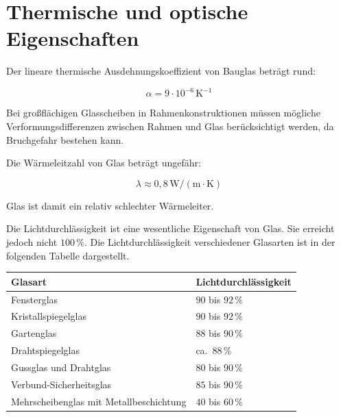 \documentclass[
  12pt,
  a4paper,
  oneside
]{scrreprt}
\begin{document}
\section{Thermische und optische Eigenschaften}

Der lineare thermische Ausdehnungskoeffizient von Bauglas beträgt rund:

\begin{equation}
  \alpha =
  9 \cdot 10^{-6}\,\mathrm{K^{-1}}
\end{equation}

Bei großflächigen Glasscheiben in Rahmenkonstruktionen müssen mögliche
Verformungsdifferenzen zwischen Rahmen und Glas berücksichtigt werden,
da Bruchgefahr bestehen kann. 

Die Wärmeleitzahl von Glas beträgt ungefähr:

\begin{equation}
  \lambda \approx 0{,}8\,\mathrm{W/(m \cdot K)}
\end{equation}

Glas ist damit ein relativ schlechter Wärmeleiter. 

Die Lichtdurchlässigkeit ist eine wesentliche Eigenschaft von Glas.
Sie erreicht jedoch nicht $100\,\%$. Die Lichtdurchlässigkeit
verschiedener Glasarten ist in der folgenden Tabelle dargestellt.

\begin{longtable}{
  >{\raggedright\arraybackslash}p{}
  >{\centering\arraybackslash}p{}
}
\toprule
\textbf{Glasart} &
\textbf{Lichtdurchlässigkeit} \\
\midrule
\endhead

Fensterglas &
$90$ bis $92\,\%$ \\

Kristallspiegelglas &
$90$ bis $92\,\%$ \\

Gartenglas &
$88$ bis $90\,\%$ \\

Drahtspiegelglas &
ca.\ $88\,\%$ \\

Gussglas und Drahtglas &
$80$ bis $90\,\%$ \\

Verbund-Sicherheitsglas &
$85$ bis $90\,\%$ \\

Mehrscheibenglas mit Metallbeschichtung &
$40$ bis $60\,\%$ \\

\bottomrule
\end{longtable}
\end{document}
